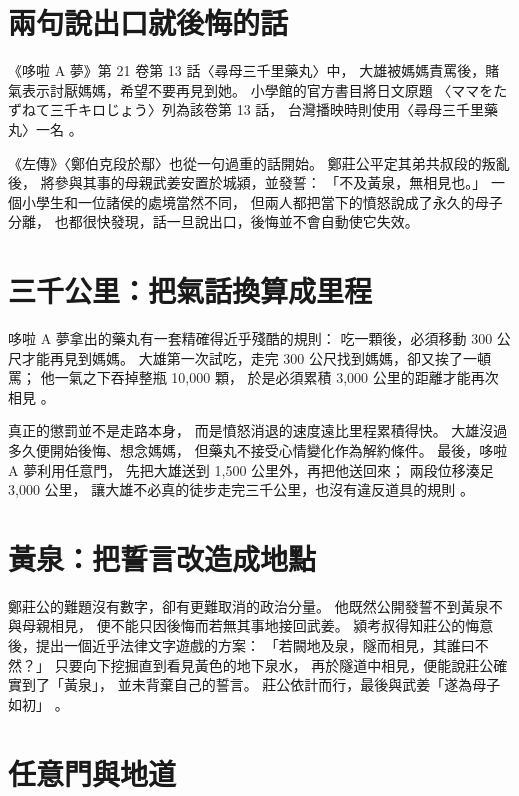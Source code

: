 \documentclass{ntu-minimal-thesis}
\begin{document}
\section{兩句說出口就後悔的話}

《哆啦 A 夢》第 21 卷第 13 話〈尋母三千里藥丸〉中，
大雄被媽媽責罵後，賭氣表示討厭媽媽，希望不要再見到她。
小學館的官方書目將日文原題
〈ママをたずねて三千キロじょう〉列為該卷第 13 話，
台灣播映時則使用〈尋母三千里藥丸〉一名
\citep{fujiko1980,litv2019}。

《左傳》〈鄭伯克段於鄢〉也從一句過重的話開始。
鄭莊公平定其弟共叔段的叛亂後，
將參與其事的母親武姜安置於城潁，並發誓：
「不及黃泉，無相見也。」
一個小學生和一位諸侯的處境當然不同，
但兩人都把當下的憤怒說成了永久的母子分離，
也都很快發現，話一旦說出口，後悔並不會自動使它失效。

\section{三千公里：把氣話換算成里程}

哆啦 A 夢拿出的藥丸有一套精確得近乎殘酷的規則：
吃一顆後，必須移動 300 公尺才能再見到媽媽。
大雄第一次試吃，走完 300 公尺找到媽媽，卻又挨了一頓罵；
他一氣之下吞掉整瓶 10,000 顆，
於是必須累積 3,000 公里的距離才能再次相見
\citep{shogakukan2020,litv2019}。

真正的懲罰並不是走路本身，
而是憤怒消退的速度遠比里程累積得快。
大雄沒過多久便開始後悔、想念媽媽，
但藥丸不接受心情變化作為解約條件。
最後，哆啦 A 夢利用任意門，
先把大雄送到 1,500 公里外，再把他送回來；
兩段位移湊足 3,000 公里，
讓大雄不必真的徒步走完三千公里，也沒有違反道具的規則
\citep{fujiko1980}。

\section{黃泉：把誓言改造成地點}

鄭莊公的難題沒有數字，卻有更難取消的政治分量。
他既然公開發誓不到黃泉不與母親相見，
便不能只因後悔而若無其事地接回武姜。
潁考叔得知莊公的悔意後，提出一個近乎法律文字遊戲的方案：
「若闕地及泉，隧而相見，其誰曰不然？」
只要向下挖掘直到看見黃色的地下泉水，
再於隧道中相見，便能說莊公確實到了「黃泉」，
並未背棄自己的誓言。
莊公依計而行，最後與武姜「遂為母子如初」
\citep{zuozhuan}。

\section{任意門與地道}
\end{document}
